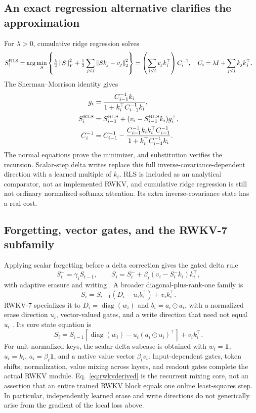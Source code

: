 \documentclass{article}
\theoremstyle{remark}\newtheorem{remark}[theorem]{Remark}
\newcommand{\diag}{\operatorname{diag}}
\newcommand{\norm}[1]{\left\lVert #1\right\rVert}
\begin{document}
\subsection{An exact regression alternative clarifies the approximation}
For $\lambda>0$, cumulative ridge regression solves
\begin{equation}
 S_i^{\rm RLS}=\arg\min_S\left\{\tfrac\lambda2\norm{S}_F^2+
 \tfrac12\sum_{j\le i}\norm{Sk_j-v_j}_2^2\right\}
 =\left(\sum_{j\le i}v_jk_j^\top\right)C_i^{-1},
 \quad C_i=\lambda I+\sum_{j\le i}k_jk_j^\top.
\end{equation}
The Sherman--Morrison identity gives
\begin{align}
 g_i&=\frac{C_{i-1}^{-1}k_i}{1+k_i^\top C_{i-1}^{-1}k_i},\nonumber\\
 S_i^{\rm RLS}&=S_{i-1}^{\rm RLS}+(v_i-S_{i-1}^{\rm RLS}k_i)g_i^\top,\nonumber\\
 C_i^{-1}&=C_{i-1}^{-1}-
 \frac{C_{i-1}^{-1}k_ik_i^\top C_{i-1}^{-1}}{1+k_i^\top C_{i-1}^{-1}k_i}.
 \label{eq:rls}
\end{align}
The normal equations prove the minimizer, and substitution verifies the recursion. Scalar-step delta writes replace this full inverse-covariance-dependent direction with a learned multiple of $k_i$. RLS is included as an analytical comparator, not as implemented RWKV, and cumulative ridge regression is still not ordinary normalized softmax attention. Its extra inverse-covariance state has a real cost.

\subsection{Forgetting, vector gates, and the RWKV-7 subfamily}
Applying scalar forgetting before a delta correction gives the gated delta rule
\begin{equation}
 S_i^-=\gamma_iS_{i-1},\qquad
 S_i=S_i^-+\beta_i(v_i-S_i^-k_i)k_i^\top,
 \label{eq:gateddelta}
\end{equation}
with adaptive erasure and writing \cite{gateddelta}. A broader diagonal-plus-rank-one family is
\begin{equation}
 S_i=S_{i-1}(D_i-u_ib_i^\top)+v_ik_i^\top.
 \label{eq:generalizedstate}
\end{equation}
RWKV-7 specializes it to $D_i=\diag(w_i)$ and $b_i=a_i\odot u_i$, with a normalized erase direction $u_i$, vector-valued gates, and a write direction that need not equal $u_i$ \cite{rwkv7}. Its core state equation is
\begin{equation}
 S_i=S_{i-1}\!\left[\diag(w_i)-u_i(a_i\odot u_i)^\top\right]+v_ik_i^\top.
 \label{eq:rwkvderived}
\end{equation}
For unit-normalized keys, the scalar delta subcase is obtained with $w_i=\mathbf1$, $u_i=k_i$, $a_i=\beta_i\mathbf1$, and a native value vector $\beta_iv_i$. Input-dependent gates, token shifts, normalization, value mixing across layers, and readout gates complete the actual RWKV module. Eq.~\eqref{eq:rwkvderived} is the recurrent mixing core, not an assertion that an entire trained RWKV block equals one online least-squares step. In particular, independently learned erase and write directions do not generically arise from the gradient of the local loss above.
\end{document}
